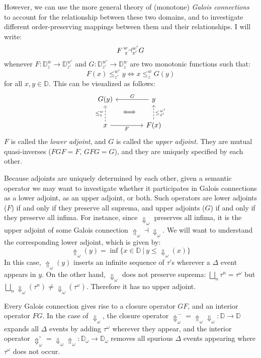 \documentclass[11pt]{article}
\begin{document}
However,
we can use the more general theory of (monotone) \emph{Galois connections}
to account for the relationship between these two domains,
and to investigate different order-preserving mappings between them
and their relationships.
I will write:
\[
    F \prescript{w}{z}\dashv^{w'}_{z'} G
\]
whenever
$F : {\mathbb{D}^w_z} \rightarrow {\mathbb{D}^{w'}_{z'}}$ and
$G : {\mathbb{D}^{w'}_{z'}} \rightarrow {\mathbb{D}^w_z}$
are two monotonic functions such that:
\[
    F(x) \le^{w'}_{z'} y \Leftrightarrow x \le^w_z G(y)
\]
for all $x, y \in \mathbb{D}$.
This can be visualized as follows:
\[
  \begin{tikzcd}[row sep=tiny, column sep=tiny]
    G(y) &  & y \arrow[ll, "G"'] \\
    & \Longleftrightarrow & \\
    x \arrow[uu, dashed, "\le^w_z"] \arrow[rr, "F"'] & &
    F(x) \arrow[uu, dashed, "\le^{w'}_{z'}"']
  \end{tikzcd}
\]
$F$ is called the \emph{lower adjoint}, and
$G$ is called the \emph{upper adjoint}.
They are mutual quasi-inverses ($FGF = F$, $GFG = G$),
and they are uniquely specified by each other.

Because adjoints are uniquely determined by each other,
given a semantic operator
we may want to investigate whether it participates
in Galois connections as a lower adjoint, as an upper adjoint, or both.
Such operators are
lower adjoints ($F$) if and only if they preserve all suprema, and
upper adjoints ($G$) if and only if they preserve all infima.
For instance, since $\Downarrow_\omega$ preserves all infima,
it is the upper adjoint of some Galois connection
${\Uparrow}_\omega \dashv {\Downarrow}_\omega$.
We will want to understand the corresponding lower adjoint,
which is given by:
\[
    {\Uparrow_\omega}(y) =
      \inf \{ x \in \mathbb{D} \:|\: y \le {\Downarrow_\omega}(x) \}
\]
In this case,
${\Uparrow}_\omega(y)$ inserts an infinite sequence of $\tau$'s
wherever a $\Delta$ event appears in $y$.
On the other hand,
$\Downarrow_\omega$ does not preserve suprema:
$\bigsqcup_n \tau^n = \tau^\omega$ but
$\bigsqcup_n {\Downarrow}_\omega(\tau^n) \neq {\Downarrow}_\omega(\tau^\omega)$.
Therefore it has no upper adjoint.

Every Galois connection gives rise to a closure operator $GF$,
and an interior operator $FG$.
In the case of $\Downarrow_\omega$,
the closure operator
${\Updownarrow}_\omega^- =
 {\Uparrow}_\omega {\Downarrow_\omega} :
 \mathbb{D} \rightarrow \mathbb{D}$
expands all $\Delta$ events by adding
$\tau^\omega$ wherever they appear,
and the interior operator
${\Updownarrow}_\omega^\circ =
 {\Downarrow}_\omega {\Uparrow}_\omega :
 \mathbb{D}_\omega \rightarrow \mathbb{D}_\omega$
removes all spurious $\Delta$ events
appearing where $\tau^\omega$ does not occur.
\end{document}

